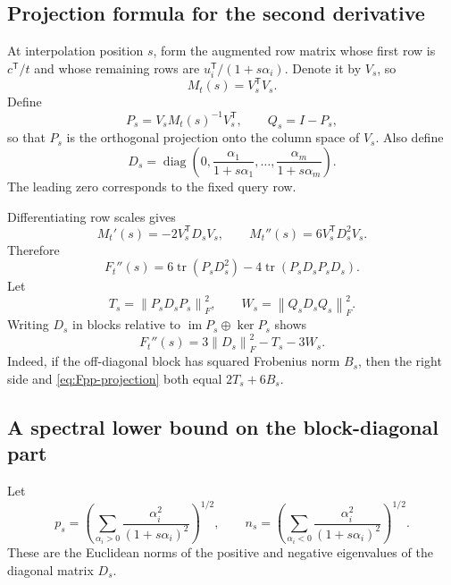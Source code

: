 \documentclass[11pt]{article}
\theoremstyle{definition}
\newcommand{\diag}{\operatorname{diag}}
\newcommand{\tr}{\operatorname{tr}}
\newcommand{\im}{\operatorname{im}}
\newcommand{\norm}[1]{\left\lVert #1\right\rVert}
\begin{document}
\subsection{Projection formula for the second derivative}
At interpolation position $s$, form the augmented row matrix whose first row is $c^{\mathsf T}/t$ and whose remaining rows are $u_i^{\mathsf T}/(1+s\alpha_i)$.  Denote it by $V_s$, so
\[
  M_t(s)=V_s^{\mathsf T}V_s.
\]
Define
\begin{equation}
  P_s=V_sM_t(s)^{-1}V_s^{\mathsf T},
  \qquad
  Q_s=I-P_s,
  \label{eq:PQ}
\end{equation}
so that $P_s$ is the orthogonal projection onto the column space of $V_s$.  Also define
\begin{equation}
  D_s=\diag\!\left(0,\frac{\alpha_1}{1+s\alpha_1},\ldots,
  \frac{\alpha_m}{1+s\alpha_m}\right).
  \label{eq:Ds}
\end{equation}
The leading zero corresponds to the fixed query row.

Differentiating row scales gives
\[
  M_t'(s)=-2V_s^{\mathsf T}D_sV_s,
  \qquad
  M_t''(s)=6V_s^{\mathsf T}D_s^2V_s.
\]
Therefore
\begin{equation}
  F_t''(s)
  =6\tr(P_sD_s^2)-4\tr(P_sD_sP_sD_s).
  \label{eq:Fpp-projection}
\end{equation}
Let
\begin{equation}
  T_s=\norm{P_sD_sP_s}_F^2,
  \qquad
  W_s=\norm{Q_sD_sQ_s}_F^2.
  \label{eq:TW}
\end{equation}
Writing $D_s$ in blocks relative to $\im P_s\oplus\ker P_s$ shows
\begin{equation}
  \boxed{
  F_t''(s)=3\norm{D_s}_F^2-T_s-3W_s.
  }
  \label{eq:Fpp-exact}
\end{equation}
Indeed, if the off-diagonal block has squared Frobenius norm $B_s$, then the right side and \cref{eq:Fpp-projection} both equal $2T_s+6B_s$.

\subsection{A spectral lower bound on the block-diagonal part}
Let
\begin{equation}
  p_s=\left(\sum_{\alpha_i>0}\frac{\alpha_i^2}{(1+s\alpha_i)^2}\right)^{1/2},
  \qquad
  n_s=\left(\sum_{\alpha_i<0}\frac{\alpha_i^2}{(1+s\alpha_i)^2}\right)^{1/2}.
  \label{eq:psns}
\end{equation}
These are the Euclidean norms of the positive and negative eigenvalues of the diagonal matrix $D_s$.
\end{document}

